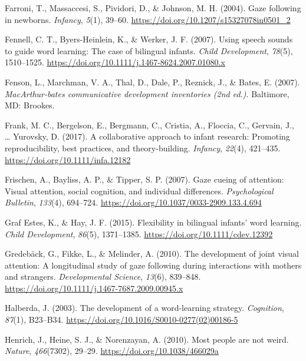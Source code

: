 \documentclass[english,,man,floatsintext]{apa6}
\begin{document}
\leavevmode\hypertarget{ref-Farroni_etal_2004}{}%
Farroni, T., Massaccesi, S., Pividori, D., \& Johnson, M. H. (2004). Gaze following in newborns. \emph{Infancy}, \emph{5}(1), 39--60. \url{https://doi.org/10.1207/s15327078in0501_2}

\leavevmode\hypertarget{ref-Fennell_etal_2007}{}%
Fennell, C. T., Byers-Heinlein, K., \& Werker, J. F. (2007). Using speech sounds to guide word learning: The case of bilingual infants. \emph{Child Development}, \emph{78}(5), 1510--1525. \url{https://doi.org/10.1111/j.1467-8624.2007.01080.x}

\leavevmode\hypertarget{ref-Fenson_etal_2007}{}%
Fenson, L., Marchman, V. A., Thal, D., Dale, P., Reznick, J., \& Bates, E. (2007). \emph{MacArthur-bates communicative development inventories (2nd ed.)}. Baltimore, MD: Brookes.

\leavevmode\hypertarget{ref-Frank_etal_2017}{}%
Frank, M. C., Bergelson, E., Bergmann, C., Cristia, A., Floccia, C., Gervain, J., \ldots{} Yurovsky, D. (2017). A collaborative approach to infant research: Promoting reproducibility, best practices, and theory-building. \emph{Infancy}, \emph{22}(4), 421--435. \url{https://doi.org/10.1111/infa.12182}

\leavevmode\hypertarget{ref-Frischen_etal_2007}{}%
Frischen, A., Bayliss, A. P., \& Tipper, S. P. (2007). Gaze cueing of attention: Visual attention, social cognition, and individual differences. \emph{Psychological Bulletin}, \emph{133}(4), 694--724. \url{https://doi.org/10.1037/0033-2909.133.4.694}

\leavevmode\hypertarget{ref-GrafEstes_Hay_2015}{}%
Graf Estes, K., \& Hay, J. F. (2015). Flexibility in bilingual infants' word learning. \emph{Child Development}, \emph{86}(5), 1371--1385. \url{https://doi.org/10.1111/cdev.12392}

\leavevmode\hypertarget{ref-Gredeback_etal_2010}{}%
Gredebäck, G., Fikke, L., \& Melinder, A. (2010). The development of joint visual attention: A longitudinal study of gaze following during interactions with mothers and strangers. \emph{Developmental Science}, \emph{13}(6), 839--848. \url{https://doi.org/10.1111/j.1467-7687.2009.00945.x}

\leavevmode\hypertarget{ref-Halberda_2003}{}%
Halberda, J. (2003). The development of a word-learning strategy. \emph{Cognition}, \emph{87}(1), B23--B34. \url{https://doi.org/10.1016/S0010-0277(02)00186-5}

\leavevmode\hypertarget{ref-Henrich_etal_2010}{}%
Henrich, J., Heine, S. J., \& Norenzayan, A. (2010). Most people are not weird. \emph{Nature}, \emph{466}(7302), 29--29. \url{https://doi.org/10.1038/466029a}
\end{document}
